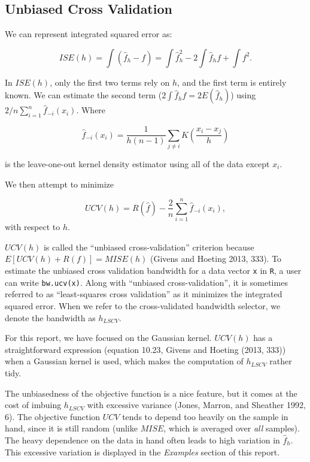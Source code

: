 \documentclass[]{article}
\begin{document}
\subsection{Unbiased Cross Validation}\label{unbiased-cross-validation}

We can represent integrated squared error as:

\[
ISE(h) = \int \left(\hat{f}_h - f\right) = \int\hat{f}_h^2 - 2\int \hat{f}_hf + \int f^2.
\]

In \(ISE(h)\), only the first two terms rely on \(h\), and the first
term is entirely known. We can estimate the second term
(\(2\int \hat{f}_hf = 2 E(\hat{f}_h)\)) using
\(2/n \sum_{i=1}^{n}\hat{f}_{-i}(x_i)\). Where

\[
\hat{f}_{-i}(x_i) = \frac{1}{h(n-1)}\sum_{j \neq i} K\left(\frac{x_i - x_j}{h}\right)
\]

is the leave-one-out kernel density estimator using all of the data
except \(x_i\).

We then attempt to minimize

\[
UCV(h) = R(\hat{f}) - \frac{2}{n} \sum_{i = 1}^{n} \hat{f}_{-i}(x_i),
\] with respect to \(h\).

\(UCV(h)\) is called the ``unbiased cross-validation'' criterion because
\(E\left[UCV(h) + R(f)\right] = MISE(h)\) (Givens and Hoeting 2013,
333). To estimate the unbiased cross validation bandwidth for a data
vector \texttt{x} in \texttt{R}, a user can write \texttt{bw.ucv(x)}.
Along with ``unbiased cross-validation'', it is sometimes referred to as
``least-squares cross validation'' as it minimizes the integrated
squared error. When we refer to the cross-validated bandwidth selector,
we denote the bandwidth as \(h_{LSCV}\).

For this report, we have focused on the Gaussian kernel. \(UCV(h)\) has
a straightforward expression (equation 10.23, Givens and Hoeting (2013,
333)) when a Gaussian kernel is used, which makes the computation of
\(h_{LSCV}\) rather tidy.

The unbiasedness of the objective function is a nice feature, but it
comes at the cost of imbuing \(h_{LSCV}\) with excessive variance
(Jones, Marron, and Sheather 1992, 6). The objective function \(UCV\)
tends to depend too heavily on the sample in hand, since it is still
random (unlike \(MISE\), which is averaged over \emph{all} samples). The
heavy dependence on the data in hand often leads to high variation in
\(\hat{f}_h\). This excessive variation is displayed in the
\emph{Examples} section of this report.
\end{document}
